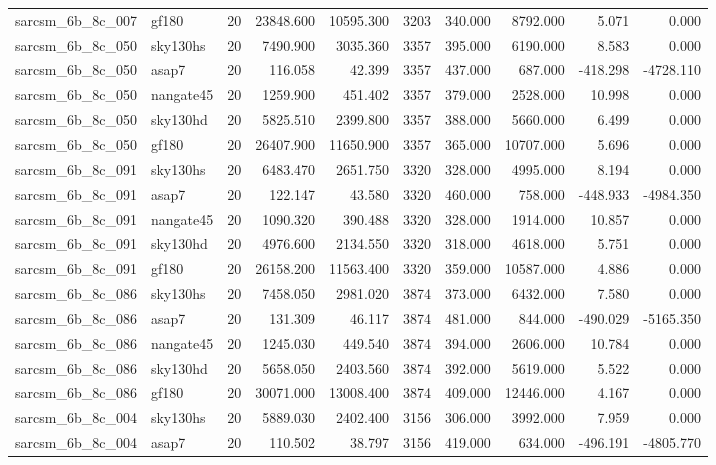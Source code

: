 \documentclass{article}
\begin{document}
\begin{longtable}{llrrrrrrrr}
sarcsm\_6b\_8c\_007 & gf180 & 20 & 23848.600 & 10595.300 & 3203 & 340.000 & 8792.000 & 5.071 & 0.000 \\
sarcsm\_6b\_8c\_050 & sky130hs & 20 & 7490.900 & 3035.360 & 3357 & 395.000 & 6190.000 & 8.583 & 0.000 \\
sarcsm\_6b\_8c\_050 & asap7 & 20 & 116.058 & 42.399 & 3357 & 437.000 & 687.000 & -418.298 & -4728.110 \\
sarcsm\_6b\_8c\_050 & nangate45 & 20 & 1259.900 & 451.402 & 3357 & 379.000 & 2528.000 & 10.998 & 0.000 \\
sarcsm\_6b\_8c\_050 & sky130hd & 20 & 5825.510 & 2399.800 & 3357 & 388.000 & 5660.000 & 6.499 & 0.000 \\
sarcsm\_6b\_8c\_050 & gf180 & 20 & 26407.900 & 11650.900 & 3357 & 365.000 & 10707.000 & 5.696 & 0.000 \\
sarcsm\_6b\_8c\_091 & sky130hs & 20 & 6483.470 & 2651.750 & 3320 & 328.000 & 4995.000 & 8.194 & 0.000 \\
sarcsm\_6b\_8c\_091 & asap7 & 20 & 122.147 & 43.580 & 3320 & 460.000 & 758.000 & -448.933 & -4984.350 \\
sarcsm\_6b\_8c\_091 & nangate45 & 20 & 1090.320 & 390.488 & 3320 & 328.000 & 1914.000 & 10.857 & 0.000 \\
sarcsm\_6b\_8c\_091 & sky130hd & 20 & 4976.600 & 2134.550 & 3320 & 318.000 & 4618.000 & 5.751 & 0.000 \\
sarcsm\_6b\_8c\_091 & gf180 & 20 & 26158.200 & 11563.400 & 3320 & 359.000 & 10587.000 & 4.886 & 0.000 \\
sarcsm\_6b\_8c\_086 & sky130hs & 20 & 7458.050 & 2981.020 & 3874 & 373.000 & 6432.000 & 7.580 & 0.000 \\
sarcsm\_6b\_8c\_086 & asap7 & 20 & 131.309 & 46.117 & 3874 & 481.000 & 844.000 & -490.029 & -5165.350 \\
sarcsm\_6b\_8c\_086 & nangate45 & 20 & 1245.030 & 449.540 & 3874 & 394.000 & 2606.000 & 10.784 & 0.000 \\
sarcsm\_6b\_8c\_086 & sky130hd & 20 & 5658.050 & 2403.560 & 3874 & 392.000 & 5619.000 & 5.522 & 0.000 \\
sarcsm\_6b\_8c\_086 & gf180 & 20 & 30071.000 & 13008.400 & 3874 & 409.000 & 12446.000 & 4.167 & 0.000 \\
sarcsm\_6b\_8c\_004 & sky130hs & 20 & 5889.030 & 2402.400 & 3156 & 306.000 & 3992.000 & 7.959 & 0.000 \\
sarcsm\_6b\_8c\_004 & asap7 & 20 & 110.502 & 38.797 & 3156 & 419.000 & 634.000 & -496.191 & -4805.770 \\

\end{longtable}
\end{document}
